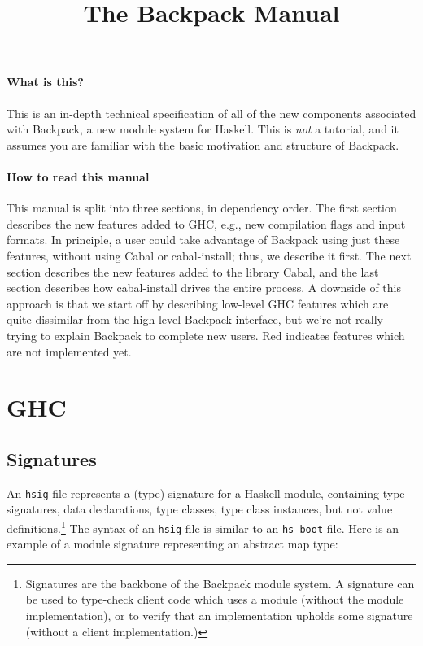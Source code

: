 \documentclass{article}
\title{The Backpack Manual}
\newcommand{\Red}[1]{{\color{red} #1}}
\begin{document}
\maketitle

\paragraph{What is this?}  This is an in-depth technical specification of
all of the new components associated with Backpack, a new module system
for Haskell.  This is \emph{not} a tutorial, and it assumes you are
familiar with the basic motivation and structure of Backpack.

\paragraph{How to read this manual}  This manual is split into three
sections, in dependency order.  The first section describes the new
features added to GHC, e.g., new compilation flags and input formats.
In principle, a user could take advantage of Backpack using just these
features, without using Cabal or cabal-install; thus, we describe it
first.  The next section describes the new features added to the library
Cabal, and the last section describes how cabal-install drives the
entire process.  A downside of this approach is that we start off by
describing low-level GHC features which are quite dissimilar from the
high-level Backpack interface, but we're not really trying to explain
Backpack to complete new users.  \Red{Red indicates features which are
not implemented yet.}

\section{GHC}

\subsection{Signatures}

An \texttt{hsig} file represents a (type) signature for a Haskell
module, containing type signatures, data declarations, type classes,
type class instances, but not value definitions.\footnote{Signatures are
the backbone of the Backpack module system.  A signature can be used to
type-check client code which uses a module (without the module
implementation), or to verify that an implementation upholds some
signature (without a client implementation.)} The syntax of an
\texttt{hsig} file is similar to an \texttt{hs-boot} file.  Here is an
example of a module signature representing an abstract map type:
\end{document}
